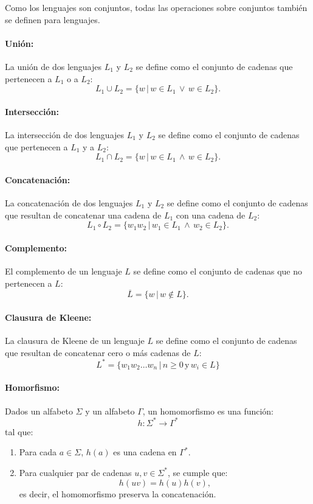 Como los lenguajes son conjuntos, todas las operaciones sobre conjuntos también se definen para lenguajes.

\paragraph{Unión:} La unión de dos lenguajes $L_1$ y $L_2$ se define como el conjunto de cadenas que
pertenecen a $L_1$ o a $L_2$:
$$L_1\cup L_2=\{w\,|\,w\in L_1\,\vee\,w\in L_2\}.$$

\paragraph{Intersección:} La intersección de dos lenguajes $L_1$ y $L_2$ se define como el conjunto de
cadenas que pertenecen a $L_1$ y a $L_2$:
$$L_1\cap L_2=\{w\,|\,w\in L_1\,\wedge\,w\in L_2\}.$$

\paragraph{Concatenación:} La concatenación de dos lenguajes $L_1$ y $L_2$ se define como el conjunto
de cadenas que resultan de concatenar una cadena de $L_1$ con una cadena de $L_2$:
$$L_1\circ L_2=\{w_1w_2\,|\,w_1\in L_1\,\wedge\,w_2\in L_2\}.$$
\paragraph{Complemento:} El complemento de un lenguaje $L$ se define como el conjunto de cadenas que no
pertenecen a $L$:
$$\overline{L}=\{w\,|\,w\notin L\}.$$
\paragraph{Clausura de Kleene:} La clausura de Kleene de un lenguaje $L$ se define como el conjunto de
cadenas que resultan de concatenar cero o más cadenas de $L$:
$$L^*=\{w_1w_2\ldots w_n\,|\,n\geq 0\,\text{y}\,w_i\in L\}$$

\paragraph{Homorfismo:} Dados un alfabeto \( \Sigma \) y un alfabeto \( \Gamma \), un homomorfismo es una función:
\[
      h: \Sigma^* \to \Gamma^*
\]
tal que:
\begin{enumerate}
      \item Para cada \( a \in \Sigma \), \( h(a) \) es una cadena en \( \Gamma^* \).
      \item Para cualquier par de cadenas \( u, v \in \Sigma^* \), se cumple que:
            \[
                  h(uv) = h(u) h(v),
            \]
            es decir, el homomorfismo preserva la concatenación.
\end{enumerate}

